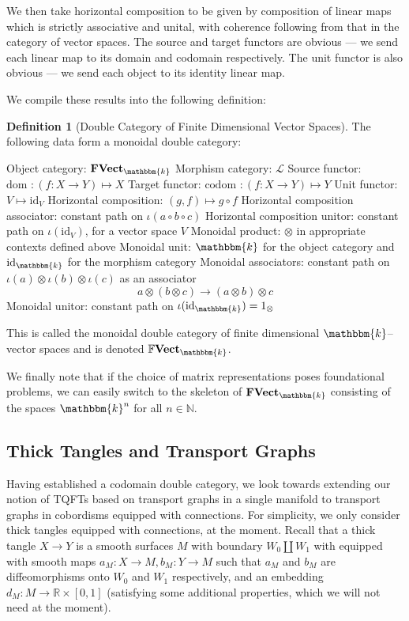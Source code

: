 \documentclass{amsart}
\newcommand{\N}{\mathbb{N}}
\newcommand{\R}{\mathbb{R}}
\newcommand{\K}{\mathbbm{k}}
\newcommand{\s}{\mathscr}
\newcommand{\tensor}{\otimes}
\renewcommand{\to}[1][]{\stackrel{#1}{\longrightarrow}}
\renewcommand{\mapsto}{\longmapsto}
\newcommand{\codom}{\text{codom }}
\newcommand{\dom}{\text{dom }}
\newcommand{\id}{\text{id}}
\newcommand{\FVect}{\textbf{FVect}}
\newcommand{\FFVect}{\mathbb{F}\textbf{Vect}}
\newcommand{\li}[1][]{\ifthenelse{\equal{#1}{}}{\item}{\item \label{#1}}}
\newenvironment{enmrt}{
  \enumerate[(i)]
  \setlength{\itemsep}{0pt}
}{
  \endenumerate
}
\numberwithin{thm}{section}
\theoremstyle{definition}
\newtheorem{defn}[thm]{Definition}
\begin{document}
We then take horizontal composition to be given by composition of linear maps
which is strictly associative and unital, with coherence following from that in
the category of vector spaces. The source and target functors are obvious --- we
send each linear map to its domain and codomain respectively. The unit functor
is also obvious --- we send each object to its identity linear map.

We compile these results into the following definition:
\begin{defn}[Double Category of Finite Dimensional Vector Spaces]
The following data form a monoidal double category:
\begin{enmrt}
\li Object category: $\FVect_{\K}$
\li Morphism category: $\s{L}$
\li Source functor: $\dom : (f : X \to Y) \mapsto X$
\li Target functor: $\codom : (f : X \to Y) \mapsto Y$
\li Unit functor: $V \mapsto \id_V$
\li Horizontal composition: $(g, f) \mapsto g \circ f$
\li Horizontal composition associator: constant path on
$\iota(a \circ b \circ c)$
\li Horizontal composition unitor: constant path on $\iota(\id_V)$, for a vector
space $V$
\li Monoidal product: $\tensor$ in appropriate contexts defined above
\li Monoidal unit: $\K$ for the object category and $\id_{\K}$ for the morphism
category
\li Monoidal associators: constant path on
$\iota(a) \tensor \iota(b) \tensor \iota(c)$ as an associator
\[
  a \tensor (b \tensor c) \to (a \tensor b) \tensor c
\]
\li Monoidal unitor: constant path on $\iota(\id_{\K}) = 1_{\tensor}$
\end{enmrt}
This is called the monoidal double category of finite dimensional $\K$--vector
spaces and is denoted $\FFVect_{\K}$.
\end{defn}

We finally note that if the choice of matrix representations poses foundational
problems, we can easily switch to the skeleton of $\FVect_{\K}$ consisting of
the spaces $\K^n$ for all $n \in \N$.

%

\subsection{Thick Tangles and Transport Graphs}

Having established a codomain double category, we look towards extending our
notion of TQFTs based on transport graphs in a single manifold to transport
graphs in cobordisms equipped with connections. For simplicity, we only consider
thick tangles equipped with connections, at the moment. Recall that a thick
tangle $X \to Y$ is a smooth surfaces $M$ with boundary $W_0 \amalg W_1$ with
equipped with smooth maps $a_M : X \to M, b_M : Y \to M$ such that $a_M$ and
$b_M$ are diffeomorphisms onto $W_0$ and $W_1$ respectively, and an embedding
$d_M : M \to \R \times [0, 1]$ (satisfying some additional properties, which we
will not need at the moment).
\end{document}
